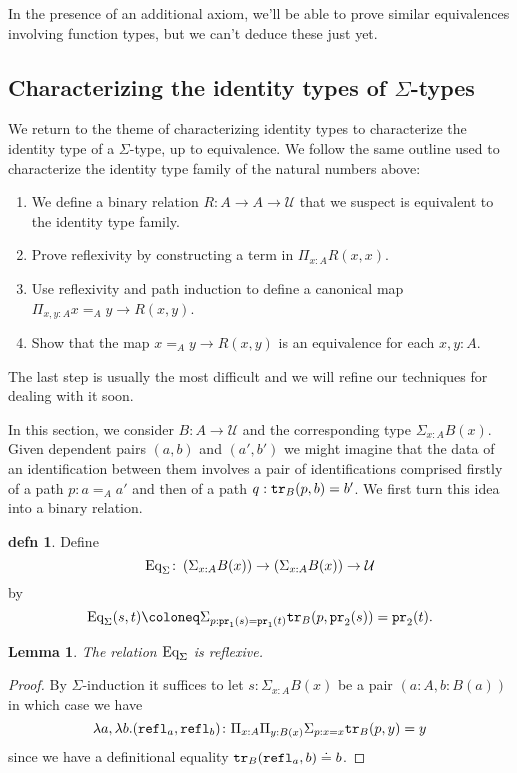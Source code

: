 \documentclass{amsart}
\theoremstyle{theorem}
\newtheorem*{lem}{Lemma}
\theoremstyle{definition}
\newtheorem*{defn}{defn}
\theoremstyle{remark}
\newcommand{\0}{\mathbbe{0}}
\newcommand{\1}{\mathbbe{1}}
\newcommand{\2}{\mathbbe{2}}
\newcommand{\3}{\mathbbe{3}}
\newcommand{\4}{\mathbbe{4}}
\newcommand{\term}[1]{{\textup{\texttt{#1}}}}
\newcommand{\pr}{\term{pr}}
\newcommand{\refl}{\term{refl}}
\newcommand{\tr}{\term{tr}}
\newcommand{\UU}{{\mathcal{U}}}
\newcommand{\Eq}{\textup{\text{Eq}}}
\begin{document}
In the presence of an additional axiom, we'll be able to prove similar equivalences involving function types, but we can't deduce these just yet.

\subsection*{Characterizing the identity types of \texorpdfstring{$\Sigma$}{Sigma}-types}

We return to the theme of characterizing identity types to characterize the identity type of a $\Sigma$-type, up to equivalence. We follow the same outline used to characterize the identity type family of the natural numbers above:
\begin{enumerate}
\item We define a binary relation $R \colon A \to A \to \UU$ that we suspect is equivalent to the identity type family.
\item Prove reflexivity by constructing a term in $\Pi_{x :A} R(x,x)$.
\item Use reflexivity and path induction to define a canonical map $\Pi_{x,y:A} x=_A y \to R(x,y)$.
\item Show that the map $x=_A y \to R(x,y)$ is an equivalence for each $x,y :A$.
\end{enumerate}
The last step is usually the most difficult and we will refine our techniques for dealing with it soon.

In this section, we consider $B \colon A \to \UU$ and the corresponding type $\Sigma_{x:A} B(x)$. Given dependent pairs $(a,b)$ and $(a',b')$ we might imagine that the data of an identification between them involves a pair of identifications comprised firstly of a path $p : a =_A a'$ and then of a path $q : \tr_B(p, b) = b'$. We first turn this idea into a binary relation.

\begin{defn} Define 
\[ \Eq_\Sigma \colon \left(\Sigma_{x:A}B(x)\right) \to \left(\Sigma_{x:A}B(x)\right) \to \UU\]
by 
\[ \Eq_\Sigma(s,t) \coloneq \Sigma_{p : \pr_1(s) = \pr_1(t)} \tr_B(p, \pr_2(s)) = \pr_2(t).\]
\end{defn}

\begin{lem} The relation $\Eq_\Sigma$ is reflexive.
\end{lem}
\begin{proof} By $\Sigma$-induction it suffices to let $s : \Sigma_{x:A}B(x)$ be a pair $(a : A, b : B(a))$ in which case we have
\[ \lambda a,\lambda b. (\refl_a,\refl_b) \colon \Pi_{x :A}\Pi_{y:B(x)} \Sigma_{p : x =x} \tr_B(p,y) = y\]
since we have a definitional equality $\tr_B(\refl_a,b) \doteq b$.
\end{proof}
\end{document}
